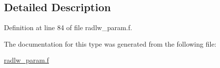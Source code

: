 \subsection{Detailed Description}


Definition at line 84 of file radlw\+\_\+param.\+f.



The documentation for this type was generated from the following file\+:\begin{DoxyCompactItemize}
\item 
\hyperlink{radlw__param_8f}{radlw\+\_\+param.\+f}\end{DoxyCompactItemize}

